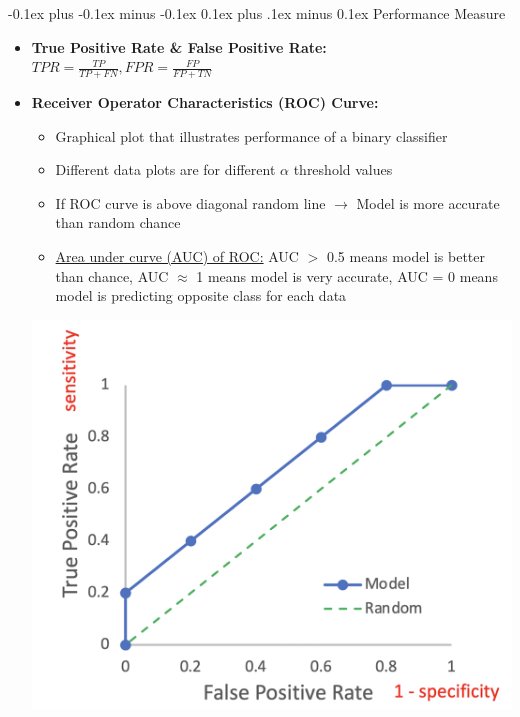 \documentclass[landscape]{article}
\makeatletter
\renewcommand{\subsection}{\@startsection{subsection}{2}{0mm}%
  {-0.1ex plus -0.1ex minus -0.1ex}%
  {0.1ex plus .1ex minus 0.1ex}%
{\normalfont\scriptsize\bfseries}}
\makeatother
\begin{document}
\begin{multicols*}{5}
        \subsection{Performance Measure}
        \begin{itemize}
          \item \textbf{True Positive Rate \& False Positive Rate:} $TPR = \frac{TP}{TP+FN}, FPR = \frac{FP}{FP+TN}$
          \item \textbf{Receiver Operator Characteristics (ROC) Curve:}
          \begin{itemize}
            \item Graphical plot that illustrates performance of a binary classifier
            \item Different data plots are for different $\alpha$ threshold values
            \item If ROC curve is above diagonal random line $\rightarrow$ Model is more accurate than random chance
            \item \underline{Area under curve (AUC) of ROC:} AUC $>$ 0.5 means model is better than chance, AUC $\approx$ 1 means model is very accurate, AUC = 0 means model is predicting opposite class for each data
          \end{itemize}
          \includegraphics[width=0.6\linewidth]{19_ROC.png}
        \end{itemize}


\end{multicols*}
\end{document}
